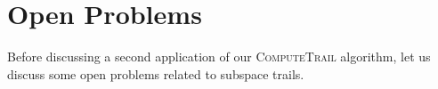 %

\section{Open Problems}\label{st:sec:conclusion}
Before discussing a second application of our \textsc{ComputeTrail} algorithm, let us discuss some open problems related to subspace trails.

